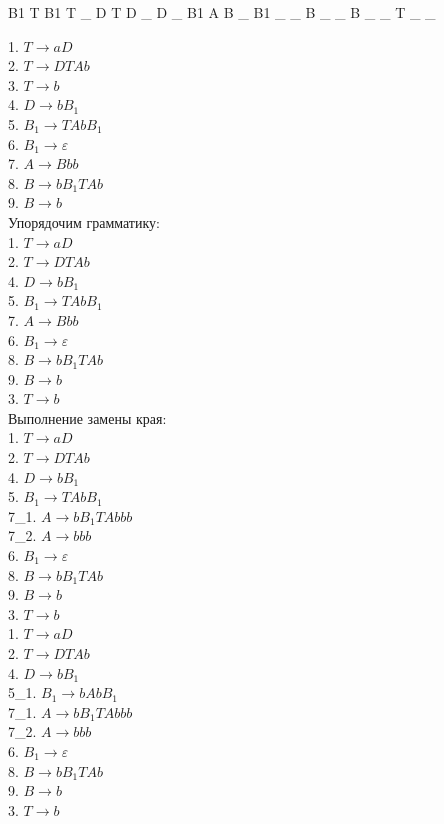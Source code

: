 \documentclass[a4paper,14pt]{extarticle}
\begin{document}
\begin{enumerate}[1.]
B1 T  B1
T  _  D
T  D  _
D  _  B1
A  B  _
B1 _  _
B  _  _
B  _  _
T  _  _
\fi

1. $T \rightarrow aD$\\
2. $T \rightarrow DTAb$\\
3. $T \rightarrow b$\\
4. $D \rightarrow bB_1$\\
5. $B_1 \rightarrow TAbB_1$\\
6. $B_1 \rightarrow \varepsilon$\\
7. $A \rightarrow Bbb$\\
8. $B \rightarrow bB_1TAb$\\
9. $B \rightarrow b$\\

Упорядочим грамматику:\\
1. $T \rightarrow aD$\\
2. $T \rightarrow DTAb$\\
4. $D \rightarrow bB_1$\\
5. $B_1 \rightarrow TAbB_1$\\
7. $A \rightarrow Bbb$\\
6. $B_1 \rightarrow \varepsilon$\\
8. $B \rightarrow bB_1TAb$\\
9. $B \rightarrow b$\\
3. $T \rightarrow b$\\

Выполнение замены края:\\
1. $T \rightarrow aD$\\
2. $T \rightarrow DTAb$\\
4. $D \rightarrow bB_1$\\
5. $B_1 \rightarrow TAbB_1$\\
7\_1. $A \rightarrow bB_1TAbbb$\\
7\_2. $A \rightarrow bbb$\\
6. $B_1 \rightarrow \varepsilon$\\
8. $B \rightarrow bB_1TAb$\\
9. $B \rightarrow b$\\
3. $T \rightarrow b$\\

1. $T \rightarrow aD$\\
2. $T \rightarrow DTAb$\\
4. $D \rightarrow bB_1$\\
5\_1. $B_1 \rightarrow bAbB_1$\\
7\_1. $A \rightarrow bB_1TAbbb$\\
7\_2. $A \rightarrow bbb$\\
6. $B_1 \rightarrow \varepsilon$\\
8. $B \rightarrow bB_1TAb$\\
9. $B \rightarrow b$\\
3. $T \rightarrow b$\\


\end{enumerate}
\end{document}
